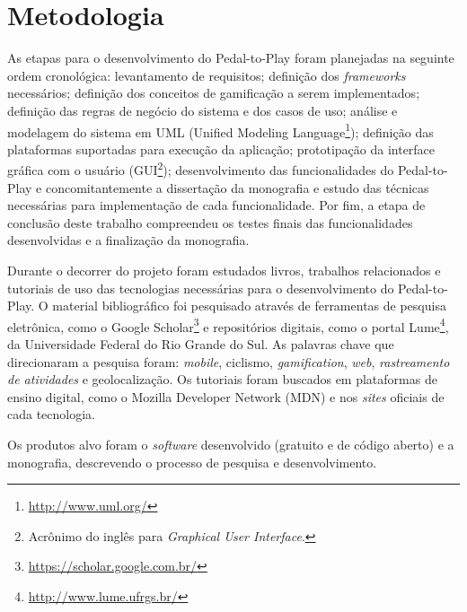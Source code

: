 \section{Metodologia} \label{sec:metodologia}
As etapas para o desenvolvimento do Pedal-to-Play foram planejadas na seguinte ordem cronológica: levantamento de requisitos; definição dos \textit{frameworks} necessários; definição dos conceitos de gamificação a serem implementados; definição das regras de negócio do sistema e dos casos de uso; análise e modelagem do sistema em UML (Unified Modeling Language\footnote{\url{http://www.uml.org/}}); definição das plataformas suportadas para execução da aplicação; prototipação da interface gráfica com o usuário (GUI\footnote{Acrônimo do inglês para \textit{Graphical User Interface}.}); desenvolvimento das funcionalidades do Pedal-to-Play e concomitantemente a dissertação da monografia e estudo das técnicas necessárias para implementação de cada funcionalidade. Por fim, a etapa de conclusão deste trabalho compreendeu os testes finais das funcionalidades desenvolvidas e a finalização da monografia. 
\par
Durante o decorrer do projeto foram estudados livros, trabalhos relacionados e tutoriais de uso das tecnologias necessárias para o  desenvolvimento do Pedal-to-Play. O material bibliográfico foi pesquisado através de ferramentas de pesquisa eletrônica, como o Google Scholar\footnote{\url{https://scholar.google.com.br/}} e repositórios digitais, como o portal Lume\footnote{\url{http://www.lume.ufrgs.br/}}, da Universidade Federal do Rio Grande do Sul. As palavras chave que direcionaram a pesquisa foram: \textit{mobile}, ciclismo, \textit{gamification}, \textit{web}, \textit{rastreamento de atividades} e geolocalização. Os tutoriais foram buscados em plataformas de ensino digital, como o Mozilla Developer Network (MDN) e nos \textit{sites} oficiais de cada tecnologia. \par
Os produtos alvo foram o \textit{software} desenvolvido (gratuito e de código aberto) e a monografia, descrevendo o processo de pesquisa e desenvolvimento.
